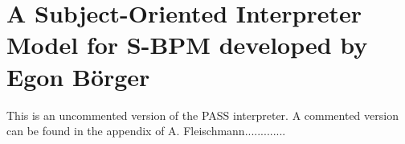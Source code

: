 \chapter{A Subject-Oriented Interpreter Model for S-BPM developed by Egon Börger}
\label{ASM-Interpreter}

This is an uncommented version of the PASS interpreter. A commented version can be found in the appendix of A. Fleischmann.............

%
%
%
%
%
%
%
%
